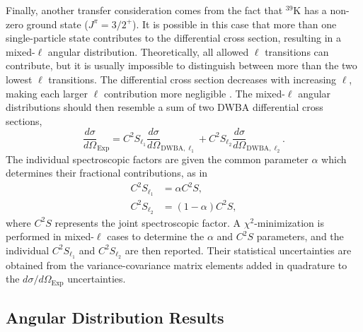 Finally, another transfer consideration comes from the fact that $^{39}$K has a non-zero ground state ($J^{\pi} = 3/2^{+}$). It is possible in this case that more than one single-particle state contributes to the differential cross section, resulting in a mixed-$\ell$ angular distribution. Theoretically, all allowed $\ell$ transitions can contribute, but it is usually impossible to distinguish between more than the two lowest $\ell$ transitions. The differential cross section decreases with increasing $\ell$, making each larger $\ell$ contribution more negligible \cite{Hodgson1971}. The mixed-$\ell$ angular distributions should then resemble a sum of two DWBA differential cross sections,
\begin{equation} \label{eqn:mixed_l}
\frac{d\sigma}{d\Omega}_{\mathrm{Exp}} = C^{2}S_{\ell_{1}} \frac{d\sigma}{d\Omega}_{\mathrm{DWBA},\ell_{1}} + C^{2}S_{\ell_{2}} \frac{d\sigma}{d\Omega}_{\mathrm{DWBA},\ell_{2}}.
\end{equation} 
The individual spectroscopic factors are given the common parameter $\alpha$ which determines their fractional contributions, as in
\begin{align}
C^{2}S_{\ell_{1}} &= \alpha C^{2}S, \\
C^{2}S_{\ell_{2}} &= (1 - \alpha) C^{2}S,
\end{align}
where $C^{2}S$ represents the joint spectroscopic factor. A $\chi^{2}$-minimization is performed in mixed-$\ell$ cases to determine the $\alpha$ and $C^{2}S$ parameters, and the individual $C^{2}S_{\ell_{1}}$ and $C^{2}S_{\ell_{2}}$ are then reported. Their statistical uncertainties are obtained from the variance-covariance matrix elements added in quadrature to the $d\sigma/d\Omega_{\mathrm{Exp}}$ uncertainties.

\subsection{Angular Distribution Results}

